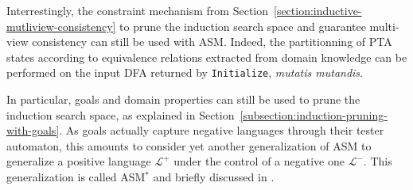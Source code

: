 Interrestingly, the constraint mechanism from Section~\ref{section:inductive-mutliview-consistency} to prune the induction search space and guarantee multi-view consistency can still be used with ASM. Indeed, the partitionning of PTA states according to equivalence relations extracted from domain knowledge can be performed on the input DFA returned by \texttt{Initialize}, \emph{mutatis mutandis}. 

In particular, goals and domain properties can still be used to prune the induction search space, as explained in Section~\ref{subsection:induction-pruning-with-goals}. As goals actually capture negative languages through their tester automaton, this amounts to consider yet another generalization of ASM to generalize a positive language $\mathcal{L}^+$ under the control of a negative one $\mathcal{L}^-$. This generalization is called ASM$^*$ and briefly discussed in \cite{Lambeau:2008}.


